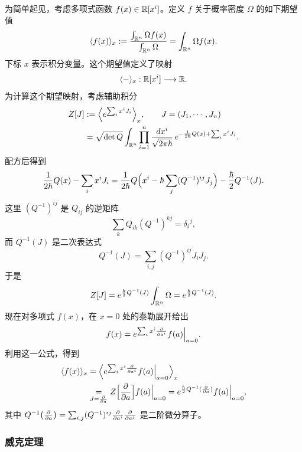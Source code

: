 为简单起见，考虑多项式函数 $f(x)\in\mathbb{R}[x^i]$。定义 $f$ 关于概率密度 $\Omega$ 的如下期望值
\[
\langle f(x)\rangle_x:=\frac{\int_{\mathbb{R}^n}\Omega f(x)}{\int_{\mathbb{R}^n}\Omega}
=\int_{\mathbb{R}^n}\Omega f(x).
\]
下标 $x$ 表示积分变量。这个期望值定义了映射
\[
\langle-\rangle_x:\mathbb{R}[x^i]\longrightarrow\mathbb{R}.
\]
为计算这个期望映射，考虑辅助积分
\begin{align*}
Z[J]&:=\Bigl\langle e^{\sum_i x^iJ_i}\Bigr\rangle_x,
\qquad J=(J_1,\cdots,J_n)\\
&=\sqrt{\det Q}\int_{\mathbb{R}^n}\prod_{i=1}^n\frac{d x^i}{\sqrt{2\pi\hbar}}\,
e^{-\frac{1}{2\hbar}Q(x)+\sum_i x^iJ_i}.
\end{align*}
配方后得到
\[
\frac{1}{2\hbar}Q(x)-\sum_i x^iJ_i
=\frac{1}{2\hbar}Q\Bigl(x^i-\hbar\sum_j(Q^{-1})^{ij}J_j\Bigr)-\frac{\hbar}{2}Q^{-1}(J).
\]
这里 $(Q^{-1})^{ij}$ 是 $Q_{ij}$ 的逆矩阵
\[
\sum_k Q_{ik}(Q^{-1})^{kj}=\delta_i{}^j,
\]
而 $Q^{-1}(J)$ 是二次表达式
\[
Q^{-1}(J)=\sum_{i,j}(Q^{-1})^{ij}J_iJ_j.
\]
于是
\[
Z[J]=e^{\frac{\hbar}{2}Q^{-1}(J)}\int_{\mathbb{R}^n}\Omega=e^{\frac{\hbar}{2}Q^{-1}(J)}.
\]
现在对多项式 $f(x)$，在 $x=0$ 处的泰勒展开给出
\[
f(x)=e^{\sum_i x^i\frac{\partial}{\partial a^i}}f(a)\Big|_{a=0}.
\]
利用这一公式，得到
\begin{align*}
\langle f(x)\rangle_x
&=\Bigl\langle e^{\sum_i x^i\frac{\partial}{\partial a^i}}f(a)\Big|_{a=0}\Bigr\rangle_x\\
&\underset{J=\frac{\partial}{\partial a}}{=}Z\Bigl[\frac{\partial}{\partial a}\Bigr]f(a)\Big|_{a=0}
=e^{\frac{\hbar}{2}Q^{-1}(\frac{\partial}{\partial a})}f(a)\Big|_{a=0},
\end{align*}
其中 $Q^{-1}\bigl(\frac{\partial}{\partial a}\bigr)=\sum_{i,j}(Q^{-1})^{ij}\frac{\partial}{\partial a^i}\frac{\partial}{\partial a^j}$ 是二阶微分算子。

\subsubsection*{威克定理}

